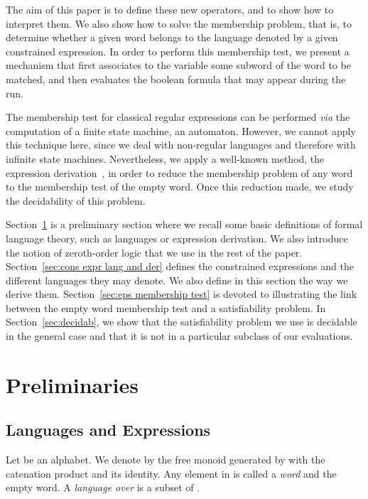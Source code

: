 \documentclass[a4paper]{llncs}
\begin{document}
  The aim of this paper is to define these new operators, and to show how to interpret them. We also show how to solve the membership problem, that is, to determine whether a given word belongs to the language denoted by a given constrained expression. 
  In order to perform this membership test, we present a mechanism that first associates to the variable some subword of the word to be matched, and then evaluates the boolean formula that may appear during the run.
  
  The membership test for classical regular expressions can be performed \emph{via} the computation of a finite state machine, an automaton. However, we cannot apply this technique here, since we deal with non-regular languages and therefore with infinite state machines. Nevertheless, we apply a well-known method, the expression derivation~\cite{Ant96,Brz64}, in order to reduce the membership problem of any word to the membership test of the empty word. Once this reduction made, we study the decidability of this problem.
  
  Section~\ref{se:pre} is a preliminary section where  we recall some basic definitions of formal language theory, such as languages or expression derivation. We also introduce the notion of zeroth-order logic that we use in the rest of the paper.
  Section~\ref{sec:cons expr lang and der} defines the constrained expressions and the different languages they may denote. We also define in this section the way we derive them.
  Section~\ref{sec:eps membership test} is devoted to illustrating the link between the empty word membership test and a satisfiability problem.
  In Section~\ref{sec:decidab}, we show that the satisfiability problem we use is decidable in the general case and that it is not in a particular subclass of our evaluations.
  
    

\section{Preliminaries}\label{se:pre}

  \subsection{Languages and Expressions}
  
  Let  be an alphabet. We denote by  the free monoid generated by  with  the catenation product and  its identity. Any element in  is called a \emph{word} and  the empty word. A \emph{language over}  is a subset of . 
  
\end{document}
